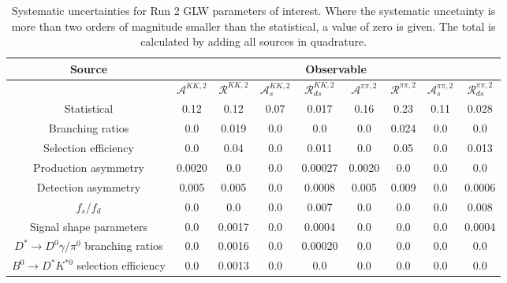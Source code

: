 \begin{sidewaystable}
  \centering
  \begin{tabular}{ccccccccc}
      \toprule
      Source & \multicolumn{8}{c}{Observable} \\
      \midrule
       & $\mathcal{A}^{KK,2}$ & $\mathcal{R}^{KK,2}$ & $\mathcal{A}_s^{KK,2}$ & $\mathcal{R}_{ds}^{KK,2}$ & $\mathcal{A}^{\pi\pi,2}$ & $\mathcal{R}^{\pi\pi,2}$ & $\mathcal{A}_s^{\pi\pi,2}$ & $\mathcal{R}_{ds}^{\pi\pi,2}$ \\
      \midrule
      Statistical & 0.12 & 0.12 & 0.07 & 0.017 & 0.16 & 0.23 & 0.11 & 0.028 \\
      \midrule
      Branching ratios & 0.0  & 0.019 & 0.0  & 0.0  & 0.0  & 0.024 & 0.0  & 0.0  \\
      Selection efficiency & 0.0  & 0.04 & 0.0  & 0.011 & 0.0  & 0.05 & 0.0  & 0.013 \\
      Production asymmetry & 0.0020 & 0.0  & 0.0  & 0.00027 & 0.0020 & 0.0  & 0.0  & 0.0  \\
      Detection asymmetry & 0.005 & 0.005 & 0.0  & 0.0008 & 0.005 & 0.009 & 0.0  & 0.0006 \\
      $f_s/f_d$ & 0.0  & 0.0  & 0.0  & 0.007 & 0.0  & 0.0  & 0.0  & 0.008 \\
      Signal shape parameters & 0.0  & 0.0017 & 0.0  & 0.0004 & 0.0  & 0.0  & 0.0  & 0.0004 \\
      $D^* \to D^0 \gamma/\pi^0$ branching ratios & 0.0  & 0.0016 & 0.0  & 0.00020 & 0.0  & 0.0  & 0.0  & 0.0  \\
      $B^0 \to D^* K^{*0}$ selection efficiency & 0.0  & 0.0013 & 0.0  & 0.0  & 0.0  & 0.0  & 0.0  & 0.0  \\
      \bottomrule
  \end{tabular}
  \caption{Systematic uncertainties for Run 2 GLW parameters of interest. Where the systematic uncetainty is more than two orders of magnitude smaller than the statistical, a value of zero is given. The total is calculated by adding all sources in quadrature.}
\label{tab:KK_run2_systematics}
\end{sidewaystable}
